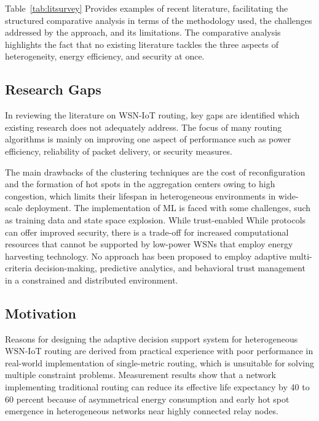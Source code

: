 \documentclass[a4paper,fleqn]{cas-dc}
\numberwithin{equation}{section}
\begin{document}
Table~\ref{tab:litsurvey} Provides examples of recent literature,
facilitating the structured comparative analysis in terms of the
methodology used, the challenges addressed by the approach, and its
limitations. The comparative analysis highlights the fact that no existing
literature tackles the three aspects of heterogeneity, energy efficiency, and security
at once.

\subsection{Research Gaps}
\label{subsec:gaps}

In reviewing the literature on WSN-IoT routing, key gaps are identified which existing research does not adequately address.
The focus of many routing algorithms is mainly on improving one aspect of performance such as power efficiency, reliability of packet delivery, or security measures.

The main drawbacks of the clustering techniques are the cost of reconfiguration
and the formation of hot spots in the aggregation centers owing to high congestion,
which limits their lifespan in heterogeneous environments in wide-scale deployment.
The implementation of ML is faced with some challenges, such as training data and state space explosion.\cite{R16_SharedFcomp2025} While trust-enabled
While protocols can offer improved security, there is a trade-off for
increased computational resources that cannot be supported by low-power WSNs
that employ energy harvesting technology. No approach has been proposed to
employ adaptive multi-criteria decision-making, predictive analytics, and
behavioral trust management in a constrained and distributed environment.

\subsection{Motivation}
\label{subsec:motivation}

Reasons for designing the adaptive decision support system
for heterogeneous WSN-IoT routing are derived from practical experience
with poor performance in real-world implementation of single-metric
routing, which is unsuitable for solving multiple constraint problems.
\cite{Laroui2021EdgeFogIoT,R19_Falch2025TechnoEconomicsIoTOT}
Measurement results show that a network implementing traditional routing
can reduce its effective life expectancy by 40 to 60 percent because of
asymmetrical energy consumption and early hot spot emergence in
heterogeneous networks near highly connected relay nodes.
\end{document}
